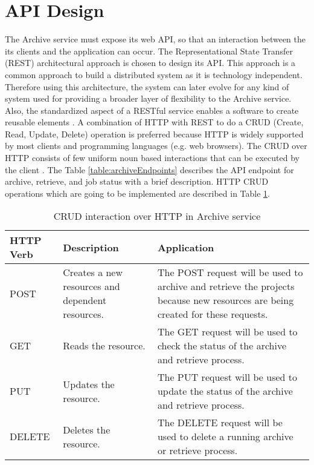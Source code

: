 \section{API Design}
\label{section:APIDesign}
    The Archive service must expose its web API, so that an interaction between the its clients and the application can occur.
    The Representational State Transfer (REST) \cite[Chapter.~5]{REST} architectural approach is chosen to design its API. This approach is a 
    common approach to build a distributed system as it is technology independent. Therefore using this architecture, the system can later 
    evolve for any kind of system used for providing a broader layer of flexibility to the Archive service. 
    Also, the standardized aspect of a RESTful service enables a software to create reusable elements \cite{RESTThesis}. A combination of HTTP with REST 
    to do a CRUD (Create, Read, Update, Delete) operation is preferred because HTTP is widely supported by most clients and programming languages (e.g. web browsers).
    The CRUD over HTTP consists of few uniform noun based interactions that can be executed by the client \cite[p.~13]{RESTThesis}. The
    Table \ref{table:archiveEndpoints} describes the API endpoint for archive, retrieve, and job status with a brief description.
    HTTP CRUD operations which are going to be implemented are described in Table \ref{table:curdHttp}. 

    \begin{table}[H]
        \centering
        \begin{tabular}{|p{2cm}|p{4cm}|p{7.5cm}|}
            \hline
                \textbf{HTTP Verb}  & \textbf{Description} & \textbf{Application}\\
            \hline
                POST & 
                Creates a new resources and dependent resources.
                & The POST request will be used to archive and retrieve the projects because new resources are being created for these requests.\\
            \hline
                GET & Reads the resource. & The GET request will be used to check the status of the archive and retrieve process. \\
            \hline
            PUT & Updates the resource. & The PUT request will be used to update the status of the archive and retrieve process. \\
            \hline
                DELETE & Deletes the resource. & The DELETE request will be used to delete a running archive or retrieve process. \\                
            \hline
        \end{tabular}
        \caption{CRUD interaction over HTTP in Archive service}
        \label{table:curdHttp}     
    \end{table}   
    
